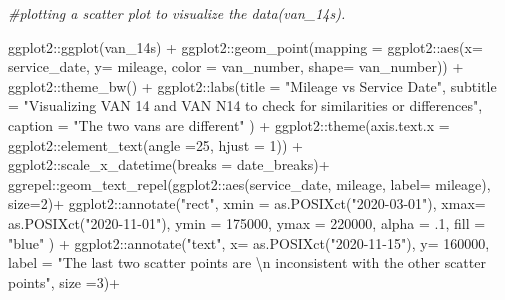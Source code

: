 \documentclass[
]{article}
\newenvironment{Shaded}{\begin{snugshade}}{\end{snugshade}}
\newcommand{\AttributeTok}[1]{\textcolor[rgb]{0.77,0.63,0.00}{#1}}
\newcommand{\CommentTok}[1]{\textcolor[rgb]{0.56,0.35,0.01}{\textit{#1}}}
\newcommand{\DecValTok}[1]{\textcolor[rgb]{0.00,0.00,0.81}{#1}}
\newcommand{\FunctionTok}[1]{\textcolor[rgb]{0.00,0.00,0.00}{#1}}
\newcommand{\NormalTok}[1]{#1}
\newcommand{\SpecialCharTok}[1]{\textcolor[rgb]{0.00,0.00,0.00}{#1}}
\newcommand{\StringTok}[1]{\textcolor[rgb]{0.31,0.60,0.02}{#1}}
\begin{document}
\begin{Shaded}
\begin{Highlighting}[]
\CommentTok{\#plotting a scatter plot to visualize the data(van\_14s).}

\NormalTok{ggplot2}\SpecialCharTok{::}\FunctionTok{ggplot}\NormalTok{(van\_14s) }\SpecialCharTok{+} 
\NormalTok{  ggplot2}\SpecialCharTok{::}\FunctionTok{geom\_point}\NormalTok{(}\AttributeTok{mapping =}\NormalTok{ ggplot2}\SpecialCharTok{::}\FunctionTok{aes}\NormalTok{(}\AttributeTok{x=}\NormalTok{ service\_date, }\AttributeTok{y=}\NormalTok{ mileage, }\AttributeTok{color =}\NormalTok{ van\_number, }\AttributeTok{shape=}\NormalTok{ van\_number)) }\SpecialCharTok{+}
\NormalTok{  ggplot2}\SpecialCharTok{::}\FunctionTok{theme\_bw}\NormalTok{() }\SpecialCharTok{+} 
\NormalTok{  ggplot2}\SpecialCharTok{::}\FunctionTok{labs}\NormalTok{(}\AttributeTok{title =} \StringTok{"Mileage vs Service Date"}\NormalTok{, }\AttributeTok{subtitle =} \StringTok{"Visualizing VAN 14 and VAN N14 to check for similarities or differences"}\NormalTok{, }\AttributeTok{caption =} \StringTok{"The two vans are different"}\NormalTok{ ) }\SpecialCharTok{+} 
\NormalTok{  ggplot2}\SpecialCharTok{::}\FunctionTok{theme}\NormalTok{(}\AttributeTok{axis.text.x =}\NormalTok{ ggplot2}\SpecialCharTok{::}\FunctionTok{element\_text}\NormalTok{(}\AttributeTok{angle =}\DecValTok{25}\NormalTok{, }\AttributeTok{hjust =} \DecValTok{1}\NormalTok{)) }\SpecialCharTok{+} 
\NormalTok{  ggplot2}\SpecialCharTok{::}\FunctionTok{scale\_x\_datetime}\NormalTok{(}\AttributeTok{breaks =}\NormalTok{ date\_breaks)}\SpecialCharTok{+}\NormalTok{ ggrepel}\SpecialCharTok{::}\FunctionTok{geom\_text\_repel}\NormalTok{(ggplot2}\SpecialCharTok{::}\FunctionTok{aes}\NormalTok{(service\_date, mileage, }\AttributeTok{label=}\NormalTok{ mileage), }\AttributeTok{size=}\DecValTok{2}\NormalTok{)}\SpecialCharTok{+}
\NormalTok{ggplot2}\SpecialCharTok{::}\FunctionTok{annotate}\NormalTok{(}\StringTok{"rect"}\NormalTok{, }\AttributeTok{xmin =} \FunctionTok{as.POSIXct}\NormalTok{(}\StringTok{"2020{-}03{-}01"}\NormalTok{), }\AttributeTok{xmax=} \FunctionTok{as.POSIXct}\NormalTok{(}\StringTok{"2020{-}11{-}01"}\NormalTok{), }\AttributeTok{ymin =} \DecValTok{175000}\NormalTok{, }\AttributeTok{ymax =} \DecValTok{220000}\NormalTok{, }\AttributeTok{alpha =}\NormalTok{ .}\DecValTok{1}\NormalTok{, }\AttributeTok{fill =} \StringTok{"blue"}\NormalTok{ ) }\SpecialCharTok{+}
\NormalTok{  ggplot2}\SpecialCharTok{::}\FunctionTok{annotate}\NormalTok{(}\StringTok{"text"}\NormalTok{, }\AttributeTok{x=} \FunctionTok{as.POSIXct}\NormalTok{(}\StringTok{"2020{-}11{-}15"}\NormalTok{), }\AttributeTok{y=} \DecValTok{160000}\NormalTok{, }\AttributeTok{label =} \StringTok{"The last two scatter points are }\SpecialCharTok{\textbackslash{}n}\StringTok{ inconsistent with the other scatter points"}\NormalTok{, }\AttributeTok{size =}\DecValTok{3}\NormalTok{)}\SpecialCharTok{+}

\end{Highlighting}
\end{Shaded}
\end{document}
